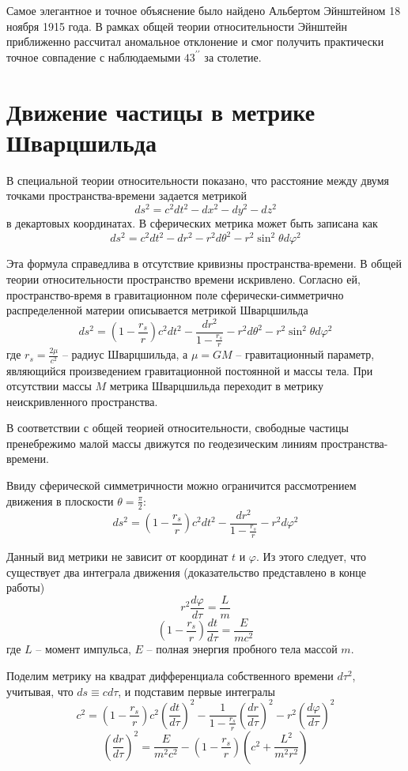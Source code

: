 \documentclass[14pt, a4paper]{report}
\begin{document}
Самое элегантное и точное объяснение было найдено Альбертом Эйнштейном 18 ноября 1915 года. В рамках общей теории относительности Эйнштейн приближенно рассчитал аномальное отклонение и смог получить практически точное совпадение с наблюдаемыми $43^{\prime\prime}$ за столетие.

\section{Движение частицы в метрике Шварцшильда}

В специальной теории относительности показано, что расстояние между двумя точками пространства-времени задается метрикой
\[ds^2=c^2dt^2-dx^2-dy^2-dz^2\]
в декартовых координатах. В сферических метрика может быть записана как
\[ds^2=c^2dt^2-dr^2-r^2d\theta^2-r^2\sin^2\theta d\varphi^2\]

Эта формула справедлива в отсутствие кривизны пространства-времени. В общей теории относительности пространство времени искривлено. Согласно ей, пространство-время в гравитационном поле сферически-симметрично распределенной материи описывается метрикой Шварцшильда
\[ds^2=\left(1-\frac{r_s}{r}\right)c^2dt^2-\frac{dr^2}{1-\frac{r_s}{r}}-r^2d\theta^2-r^2\sin^2\theta d\varphi^2\]
где $r_s=\frac{2\mu}{c^2}$ -- радиус Шварцшильда, а $\mu=GM$ -- гравитационный параметр, являющийся произведением гравитационной постоянной и массы тела. При отсутствии массы $M$ метрика Шварцшильда переходит в метрику неискривленного пространства.

В соответствии с общей теорией относительности, свободные частицы пренебрежимо малой массы движутся по геодезическим линиям пространства-времени.

Ввиду сферической симметричности можно ограничится рассмотрением движения в плоскости $\theta=\frac{\pi}{2}$:
\[ds^2=\left(1-\frac{r_s}{r}\right)c^2dt^2-\frac{dr^2}{1-\frac{r_s}{r}}-r^2 d\varphi^2\]

Данный вид метрики не зависит от координат $t$ и $\varphi$. Из этого следует, что существует два интеграла движения (доказательство представлено в конце работы)
\[r^2\frac{d\varphi}{d\tau}=\frac{L}{m}\]
\[\left(1-\frac{r_s}{r}\right)\frac{dt}{d\tau}=\frac{E}{mc^2}\]
где $L$ -- момент импульса, $E$ -- полная энергия пробного тела массой $m$.

Поделим метрику на квадрат дифференциала собственного времени $d\tau^2$, учитывая, что $ds\equiv cd\tau$, и подставим первые интегралы
\[c^2=\left(1-\frac{r_s}{r}\right)c^2\left(\frac{dt}{d\tau}\right)^2-\frac{1}{1-\frac{r_s}{r}}\left(\frac{dr}{d\tau}\right)^2-r^2\left(\frac{d\varphi}{d\tau}\right)^2\]
\[\left(\frac{dr}{d\tau}\right)^2=\frac{E}{m^2c^2}-\left(1-\frac{r_s}{r}\right)\left(c^2+\frac{L^2}{m^2r^2}\right)\]
\end{document}

